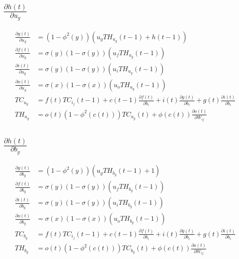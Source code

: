 \documentclass{article}
\begin{document}
\subsection{$\frac{\partial h(t)}{\partial u_{g}}$}

\begin{equation}
\begin{aligned}
\frac{\partial g(t)}{\partial u_{g}} &=  
(1-\phi^2(y))(u_g TH_{u_{g}}(t-1)+ h(t-1))  \\
\frac{\partial f(t)}{\partial u_{g}} &=  \sigma(y)(1-\sigma(y))( u_f TH_{u_{g}}(t-1)) \\
\frac{\partial i(t)}{\partial u_{g}}  &= \sigma(y)(1-\sigma(y))( u_i TH_{u_{g}}(t-1))  \\
\frac{\partial o(t)}{\partial u_{g}} &=  \sigma(x)(1-\sigma(x))( u_o TH_{u_{g}}(t-1))  \\
TC_{u_{g}}&= f(t) TC_{i_j}(t-1) + c(t-1)\frac{\partial f(t)}{ \partial b_i} + i(t)\frac{\partial g(t) }{\partial b_i}  + g(t)\frac{\partial i(t) }{\partial b_i}  \\
TH_{u_{g}}&= o(t) (1-\phi^{2}(c(t))) TC_{u_{g}}(t)  + \phi(c(t)) \frac{\partial o(t)}{\partial W_{ij}}  
\end{aligned}
\end{equation}


\subsection{$\frac{\partial h(t)}{\partial b_{g}}$}

\begin{equation}
\begin{aligned}
\frac{\partial g(t)}{\partial b_{g}} &=  
(1-\phi^2(y))(u_g TH_{b_{g}}(t-1)+ 1)  \\
\frac{\partial f(t)}{\partial b_{g}} &=  \sigma(y)(1-\sigma(y))( u_f TH_{b_{g}}(t-1)) \\
\frac{\partial i(t)}{\partial b_{g}}  &= \sigma(y)(1-\sigma(y))(u_i TH_{b_{g}}(t-1))  \\
\frac{\partial o(t)}{\partial b_{g}} &=  \sigma(x)(1-\sigma(x))( u_o TH_{b_{g}}(t-1))  \\
TC_{b_{g}}&= f(t) TC_{i_j}(t-1) + c(t-1)\frac{\partial f(t)}{ \partial b_i} + i(t)\frac{\partial g(t) }{\partial b_i}  + g(t)\frac{\partial i(t) }{\partial b_i}  \\
TH_{b_{g}}&= o(t) (1-\phi^{2}(c(t))) TC_{b_{g}}(t)  + \phi(c(t)) \frac{\partial o(t)}{\partial W_{ij}}  
\end{aligned}
\end{equation}
\end{document}

